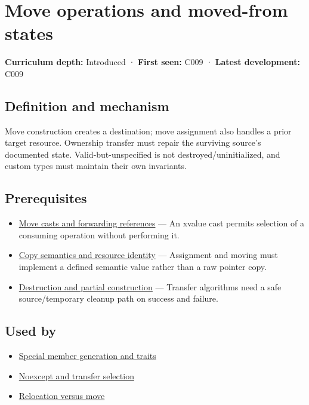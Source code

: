 \hypertarget{appendix-5636651017c2}{}
\section{Move operations and moved-from states}\label{appendix-5636651017c2-move-operations-and-moved-from-states}

\textbf{Curriculum depth:} Introduced · \textbf{First seen:} C009 · \textbf{Latest development:} C009

\subsection{Definition and mechanism}\label{appendix-5636651017c2-definition-and-mechanism}

Move construction creates a destination; move assignment also handles a prior target resource. Ownership transfer must repair the surviving source's documented state. Valid-but-unspecified is not destroyed/uninitialized, and custom types must maintain their own invariants.

\subsection{Prerequisites}\label{appendix-5636651017c2-prerequisites}

\begin{itemize}
\tightlist
\item
  \hyperref[appendix-0104b704fb11]{Move casts and forwarding references} --- An xvalue cast permits selection of a consuming operation without performing it.
\item
  \hyperref[appendix-1340cd1ce582]{Copy semantics and resource identity} --- Assignment and moving must implement a defined semantic value rather than a raw pointer copy.
\item
  \hyperref[appendix-9bfe377cef7a]{Destruction and partial construction} --- Transfer algorithms need a safe source/temporary cleanup path on success and failure.
\end{itemize}

\subsection{Used by}\label{appendix-5636651017c2-used-by}

\begin{itemize}
\tightlist
\item
  \hyperref[appendix-42e02a12c694]{Special member generation and traits}
\item
  \hyperref[appendix-c746afaa47d1]{Noexcept and transfer selection}
\item
  \hyperref[appendix-adfd6397af8d]{Relocation versus move}
\end{itemize}

